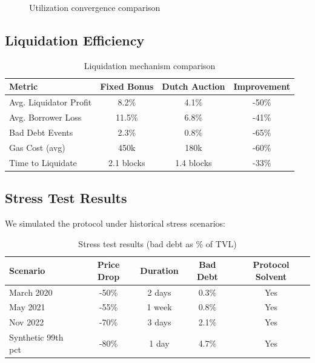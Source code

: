 \documentclass[11pt,a4paper]{article}
\begin{document}
\begin{figure}[h]
\centering
{}
\caption{Utilization convergence comparison}
\label{fig:util_convergence}
\end{figure}

\subsection{Liquidation Efficiency}

\begin{table}[h]
\centering
\begin{tabular}{@{}lccc@{}}
\toprule
Metric & Fixed Bonus & Dutch Auction & Improvement \\
\midrule
Avg. Liquidator Profit & 8.2\% & 4.1\% & -50\% \\
Avg. Borrower Loss & 11.5\% & 6.8\% & -41\% \\
Bad Debt Events & 2.3\% & 0.8\% & -65\% \\
Gas Cost (avg) & 450k & 180k & -60\% \\
Time to Liquidate & 2.1 blocks & 1.4 blocks & -33\% \\
\bottomrule
\end{tabular}
\caption{Liquidation mechanism comparison}
\label{tab:liquidation}
\end{table}

\subsection{Stress Test Results}

We simulated the protocol under historical stress scenarios:

\begin{table}[h]
\centering
\begin{tabular}{@{}lcccc@{}}
\toprule
Scenario & Price Drop & Duration & Bad Debt & Protocol Solvent \\
\midrule
March 2020 & -50\% & 2 days & 0.3\% & Yes \\
May 2021 & -55\% & 1 week & 0.8\% & Yes \\
Nov 2022 & -70\% & 3 days & 2.1\% & Yes \\
Synthetic 99th pct & -80\% & 1 day & 4.7\% & Yes \\
\bottomrule
\end{tabular}
\caption{Stress test results (bad debt as \% of TVL)}
\label{tab:stress}
\end{table}
\end{document}
